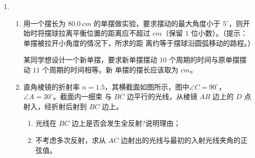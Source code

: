 \begin{enumerate}


\item 
\begin{enumerate}
\item
用一个摆长为 $ 80.0 \ cm $ 的单摆做实验，要求摆动的最大角度小于 $ 5 ^{ \circ } $，则开始时将摆球拉离平衡位置的距离应不超过 \underlinegap $ cm $（保留 $ 1 $ 位小数）。（提示：单摆被拉开小角度的情况下，所求的距
离约等于摆球沿圆弧移动的路程。）

某同学想设计一个新单摆，要求新单摆摆动 $ 10 $ 个周期的时间与原单摆摆动 $ 11 $ 个周期的时间相等。新
单摆的摆长应该取为 \underlinegap $ cm $。






\item 
直角棱镜的折射率 $ n=1.5 $，其横截面如图所示，图中$ \angle C=90 ^{ \circ } $，$ \angle A=30 ^{ \circ } $。截面内一细束
与 $ BC $ 边平行的光线，从棱镜 $ AB $ 边上的 $ D $ 点射入，经折射后射到 $ BC $ 边上。
\begin{enumerate}
\item
光线在 $ BC $ 边上是否会发生全反射?说明理由；
\item 
不考虑多次反射，求从 $ AC $ 边射出的光线与最初的入射光线夹角的正弦值。
\end{enumerate}
\begin{figure}[h!]
\flushright

\end{figure}






\end{enumerate}



\end{enumerate}

